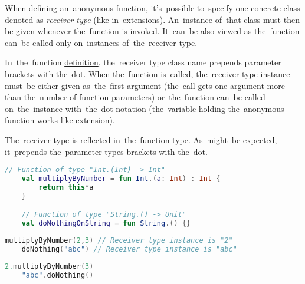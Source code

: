 \label{kotlinanonymousreceivertype}
When defining an~anonymous function, it's~possible to~specify one concrete class denoted as \textit{receiver type} (like in~\hyperref[kotlinextensions]{extensions}).
An~instance of~that class must then be given whenever the~function is invoked.
It~can~be also viewed as the~function can~be called only on~instances of~the~receiver type.

In~the~function \hyperref[declarationdefinition]{definition}, the~receiver type class name prepends parameter brackets with the~dot.
When the~function is~called, the~receiver type instance must~be either given as~the~first \hyperref[parameterargument]{argument} (the~call gets one argument more than the~number of function parameters) or~the~function can~be called on~the~instance with~the~dot notation (the~variable holding the~anonymous function works like \hyperref[kotlinextensions]{extension}).

The~receiver type is reflected in~the~function type.
As~might~be expected, it~prepends the~parameter types brackets with the~dot.

\example
\begin{lstlisting}[language=Kotlin]
    // Function of type "Int.(Int) -> Int"
    val multiplyByNumber = fun Int.(a: Int) : Int {
        return this*a
    }

    // Function of type "String.() -> Unit"
    val doNothingOnString = fun String.() {}
\end{lstlisting}
\begin{lstlisting}[language=Kotlin, title={Usage with passing receiver types instances as arguments}]
    multiplyByNumber(2,3) // Receiver type instance is "2"
    doNothing("abc") // Receiver type instance is "abc"
\end{lstlisting}
\begin{lstlisting}[language=Kotlin, title={Equivalent usage calling on receiver types instances}]
    2.multiplyByNumber(3)
    "abc".doNothing()
\end{lstlisting}
